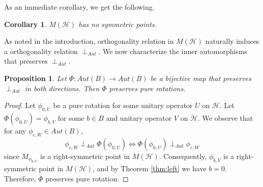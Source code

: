 \documentclass[12pt]{amsart}
\newtheorem{proposition}[theorem]{Proposition}
\newtheorem{corollary}[theorem]{Corollary}
\theoremstyle{definition}
\renewcommand{\H}{\mathcal{H}}
\begin{document}
As an immediate corollary, we get the following.

\begin{corollary}
$M(\H)$ has no symmetric points.
\end{corollary}

\noindent As noted in the introduction, orthogonality relation in $M(\H)$ naturally induces a orthogonality relation $\perp_{Aut}$. We now characterize the inner automorphisms that preserves $\perp_{Aut}$.

\begin{proposition}
Let $\Phi:Aut(B)\to Aut(B)$ be a bijective map that preserves $\perp_{Aut}$ in both directions. Then $\Phi$ preserves pure rotations.
\end{proposition}

\begin{proof}
Let $\phi_{0,U}$ be a pure rotation for some unitary operator $U$ on $\H$. Let $\Phi(\phi_{0,U})=\phi_{b,V}$ for some $b\in B$ and unitary operator $V$ on $\H$. We observe that for any $\phi_{c,W}\in Aut(B)$,  
\[
\phi_{c,W}\perp_{Aut} \Phi(\phi_{0,U}) \iff \Phi(\phi_{0,U})\perp_{Aut} \phi_{c,W}
\]
since $M_{\phi_{0,U}}$ is a right-symmetric point in $M(\H)$. Consequently, $\phi_{b,V}$ is a right-symmetric point in $M(\H)$, and by Theorem \ref{thm:left} we have $b=0$. Therefore, $\Phi$ preserves pure rotation.
\end{proof}
\end{document}
